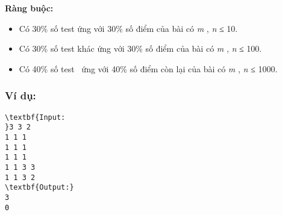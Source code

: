 \textbf{Ràng buộc: }
\begin{itemize}
	\item Có 30\% số test ứng với 30\% số điểm của bài có \emph{ m } , \emph{ n } ≤ 10.
	\item Có 30\% số test khác ứng với 30\% số điểm của bài có \emph{ m } , \emph{ n } ≤ 100.
	\item Có 40\% số test  ứng với 40\% số điểm còn lại của bài có \emph{ m } , \emph{ n } ≤ 1000.
\end{itemize}

\subsubsection{Ví dụ:}
\begin{verbatim}
\textbf{Input:
}3 3 2
1 1 1
1 1 1
1 1 1
1 1 3 3
1 1 3 2
\textbf{Output:}
3
0
\end{verbatim}

